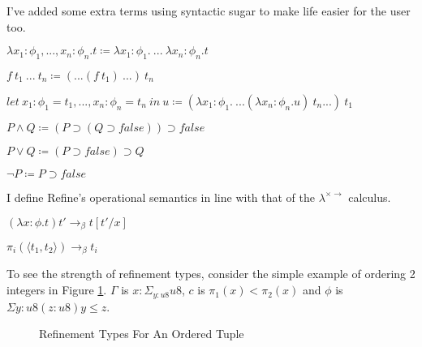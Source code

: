 I've added some extra terms using syntactic sugar to make life easier for the user too.

\begin{center}
    $\lambda x_1: \phi_1, ..., x_n: \phi_n . t \coloneqq \lambda x_1: \phi_1 .\ ...\ \lambda x_n: \phi_n . t$

    $f\ t_1\ ...\ t_n \coloneqq (...(f\ t_1)\ ...)\ t_n$

    $let\ x_1: \phi_1 = t_1, ..., x_n: \phi_n = t_n\ in\ u \coloneqq (\lambda x_1: \phi_1 .\ ...(\lambda x_n: \phi_n . u)\ t_n...)\ t_1$

    $P \land Q \coloneqq (P \supset (Q \supset false)) \supset false$

    $P \lor Q \coloneqq (P \supset false) \supset Q$

    $\lnot P \coloneqq P \supset false$
\end{center}

I define Refine's operational semantics in line with that of the $\lambda^{\times \rightarrow}$ calculus.

\begin{center}
    $(\lambda x: \phi . t) t' \rightarrow_\beta t[t'/x]$

    $\pi_i(\langle t_1, t_2 \rangle) \rightarrow_\beta t_i$
\end{center}

To see the strength of refinement types, consider the simple example of ordering 2 integers in
Figure \ref{fig:refinement_ordering}.
$\Gamma$ is $x: \Sigma_{y:u8} u8$, $c$ is $\pi_1(x) < \pi_2(x)$ and $\phi$ is $\Sigma{y:u8} (z:u8) y \leq z$.

\begin{figure}
    \centering
    \begin{prooftree}[separation=0.5em]
    \end{prooftree}
    \caption{Refinement Types For An Ordered Tuple}
    \label{fig:refinement_ordering}
\end{figure}

